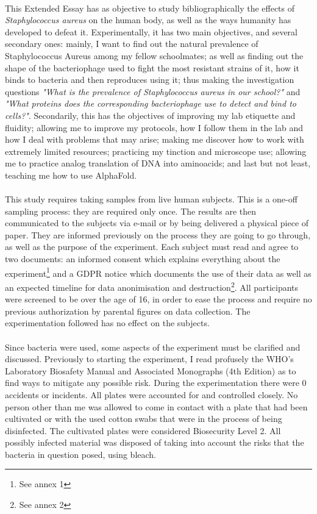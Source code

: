 \paragraph{}This Extended Essay has as objective to study bibliographically the effects of \emph{Staphylococcus aureus} on the human body, as well as the ways humanity has developed to defeat it. Experimentally, it has two main objectives, and several secondary ones: mainly, I want to find out the natural prevalence of Staphylococcus Aureus among my fellow schoolmates; as well as finding out the shape of the bacteriophage used to fight the most resistant strains of it, how it binds to bacteria and then reproduces using it; thus making the investigation questions \emph{"What is the prevalence of \emph{Staphylococcus aureus} in our school?"} and \emph{"What proteins does the corresponding bacteriophage use to detect and bind to cells?"}. Secondarily, this has the objectives of improving my lab etiquette and fluidity; allowing me to improve my protocols, how I follow them in the lab and how I deal with problems that may arise; making me discover how to work with extremely limited resources; practicing my tinction and microscope use; allowing me to practice analog translation of DNA into aminoacids; and last but not least, teaching me how to use AlphaFold.

\paragraph{}This study requires taking samples from live human subjects. This is a one-off sampling process: they are required only once. The results are then communicated to the subjects via e-mail or by being delivered a physical piece of paper. They are informed previously on the process they are going to go through, as well as the purpose of the experiment. Each subject must read and agree to two documents: an informed consent which explains everything about the experiment\footnote{See annex 1} and a GDPR notice which documents the use of their data as well as an expected timeline for data anonimisation and destruction\footnote{See annex 2}. All participants were screened to be over the age of 16, in order to ease the process and require no previous authorization by parental figures on data collection. The experimentation followed has no effect on the subjects.
\paragraph{}Since bacteria were used, some aspects of the experiment must be clarified and discussed. Previously to starting the experiment, I read profusely the WHO's Laboratory Biosafety Manual and Associated Monographs (4th Edition)\cite{worldhealthorganizationLaboratoryBiosafetyManual2020} as to find ways to mitigate any possible risk. During the experimentation there were 0 accidents or incidents. All plates were accounted for and controlled closely. No person other than me was allowed to come in contact with a plate that had been cultivated or with the used cotton swabs that were in the process of being disinfected. The cultivated plates were considered Biosecurity Level 2. All possibly infected material was disposed of taking into account the risks that the bacteria in question posed, using bleach.
